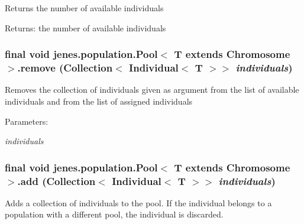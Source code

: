 Returns the number of available individuals

\begin{Desc}
\item[Returns:]the number of available individuals \end{Desc}
\hypertarget{classjenes_1_1population_1_1_pool_3_01_t_01extends_01_chromosome_01_4_fcaf4da5e38def2dfcc15f7fb26103a0}{
\subsubsection[remove]{\setlength{\rightskip}{0pt plus 5cm}final void jenes.population.Pool$<$ T extends Chromosome $>$.remove (Collection$<$ Individual$<$ T $>$$>$ {\em individuals})}}
\label{classjenes_1_1population_1_1_pool_3_01_t_01extends_01_chromosome_01_4_fcaf4da5e38def2dfcc15f7fb26103a0}


Removes the collection of individuals given as argument from the list of available individuals and from the list of assigned individuals \begin{Desc}
\item[Parameters:]
\begin{description}
\item[{\em individuals}]\end{description}
\end{Desc}
\hypertarget{classjenes_1_1population_1_1_pool_3_01_t_01extends_01_chromosome_01_4_3ca4f417430b89dc388c1b4bbf8af98e}{
\subsubsection[add]{\setlength{\rightskip}{0pt plus 5cm}final void jenes.population.Pool$<$ T extends Chromosome $>$.add (Collection$<$ Individual$<$ T $>$$>$ {\em individuals})}}
\label{classjenes_1_1population_1_1_pool_3_01_t_01extends_01_chromosome_01_4_3ca4f417430b89dc388c1b4bbf8af98e}


Adds a collection of individuals to the pool. If the individual belongs to a population with a different pool, the individual is discarded. 

